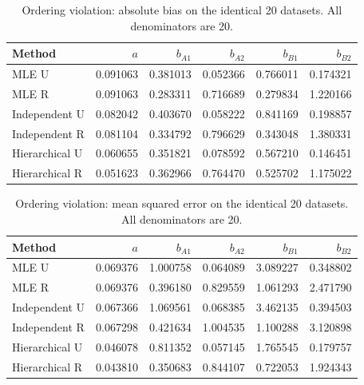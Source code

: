 \begin{table}[htbp]\centering\small

\caption{Ordering violation: absolute bias on the identical 20 datasets. All denominators are 20.}

\begin{tabular}{lrrrrr}\hline Method & $a$ & $b_{A1}$ & $b_{A2}$ & $b_{B1}$ & $b_{B2}$\\\hline

MLE U & 0.091063 & 0.381013 & 0.052366 & 0.766011 & 0.174321\\

MLE R & 0.091063 & 0.283311 & 0.716689 & 0.279834 & 1.220166\\

Independent U & 0.082042 & 0.403670 & 0.058222 & 0.841169 & 0.198857\\

Independent R & 0.081104 & 0.334792 & 0.796629 & 0.343048 & 1.380331\\

Hierarchical U & 0.060655 & 0.351821 & 0.078592 & 0.567210 & 0.146451\\

Hierarchical R & 0.051623 & 0.362966 & 0.764470 & 0.525702 & 1.175022\\

\hline\end{tabular}\end{table}

\begin{table}[htbp]\centering\small

\caption{Ordering violation: mean squared error on the identical 20 datasets. All denominators are 20.}

\begin{tabular}{lrrrrr}\hline Method & $a$ & $b_{A1}$ & $b_{A2}$ & $b_{B1}$ & $b_{B2}$\\\hline

MLE U & 0.069376 & 1.000758 & 0.064089 & 3.089227 & 0.348802\\

MLE R & 0.069376 & 0.396180 & 0.829559 & 1.061293 & 2.471790\\

Independent U & 0.067366 & 1.069561 & 0.068385 & 3.462135 & 0.394503\\

Independent R & 0.067298 & 0.421634 & 1.004535 & 1.100288 & 3.120898\\

Hierarchical U & 0.046078 & 0.811352 & 0.057145 & 1.765545 & 0.179757\\

Hierarchical R & 0.043810 & 0.350683 & 0.844107 & 0.722053 & 1.924343\\

\hline\end{tabular}\end{table}

